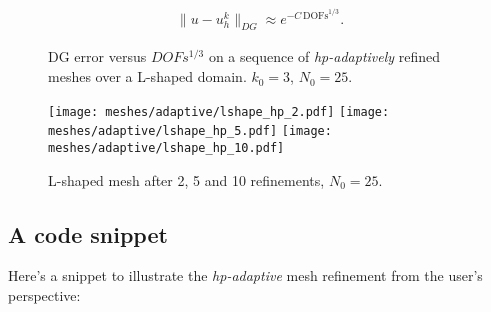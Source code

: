 \begin{gather}
    \lVert u - u^k_h \rVert_{DG} \approx e^{-C \, \text{DOFs}^{1/3}}.
\end{gather}

\begin{figure}[!ht]
    \centering
    
    \caption{DG error versus $DOFs^{1/3}$ on a sequence of \textit{hp-adaptively} refined meshes over a L-shaped domain. $k_0 = 3$, $N_0 = 25$.}
\end{figure}

\begin{figure}[!ht]
	\centering
	\texttt{[image: meshes/adaptive/lshape\_hp\_2.pdf]}
	\texttt{[image: meshes/adaptive/lshape\_hp\_5.pdf]}
	\texttt{[image: meshes/adaptive/lshape\_hp\_10.pdf]}
	\caption{L-shaped mesh after 2, 5 and 10 refinements, $N_0 = 25$.}
\end{figure}

\newpage
\subsection{A code snippet}

Here's a snippet to illustrate the \textit{hp-adaptive} mesh refinement from the user's perspective:

